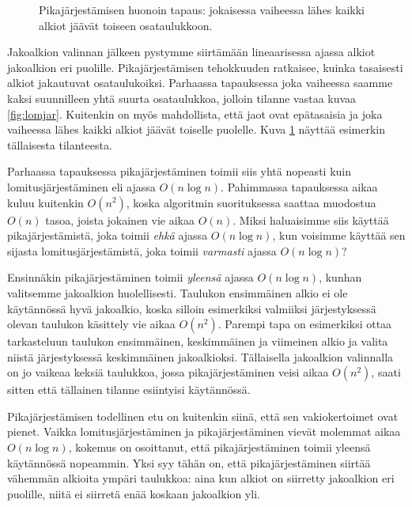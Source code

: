 \begin{figure}
\center
{}
\caption{Pikajärjestämisen huonoin tapaus: jokaisessa vaiheessa lähes kaikki
alkiot jäävät toiseen osataulukkoon.}
\label{fig:pikjar}
\end{figure}

Jakoalkion valinnan jälkeen pystymme siirtämään lineaarisessa ajassa
alkiot jakoalkion eri puolille.
Pikajärjestämisen tehokkuuden ratkaisee, kuinka tasaisesti
alkiot jakautuvat osataulukoiksi.
Parhaassa tapauksessa joka vaiheessa saamme kaksi suunnilleen
yhtä suurta osataulukkoa, jolloin tilanne vastaa kuvaa \ref{fig:lomjar}.
Kuitenkin on myös mahdollista, että jaot ovat epätasaisia ja
joka vaiheessa lähes kaikki alkiot jäävät toiselle puolelle.
Kuva \ref{fig:pikjar} näyttää esimerkin tällaisesta tilanteesta.

Parhaassa tapauksessa pikajärjestäminen toimii siis yhtä nopeasti
kuin lomitusjärjestäminen eli ajassa $O(n \log n)$.
Pahimmassa tapauksessa aikaa kuluu kuitenkin $O(n^2)$,
koska algoritmin suorituksessa saattaa muodostua $O(n)$ tasoa,
joista jokainen vie aikaa $O(n)$.
Miksi haluaisimme siis käyttää pikajärjestämistä,
joka toimii \emph{ehkä} ajassa $O(n \log n)$,
kun voisimme käyttää sen sijasta lomitusjärjestämistä,
joka toimii \emph{varmasti} ajassa $O(n \log n)$?

Ensinnäkin pikajärjestäminen toimii \emph{yleensä}
ajassa $O(n \log n)$, kunhan valitsemme jakoalkion huolellisesti.
Taulukon ensimmäinen alkio ei ole käytän\-nössä hyvä jakoalkio,
koska silloin esimerkiksi valmiiksi järjestyksessä olevan
taulukon käsittely vie aikaa $O(n^2)$.
Parempi tapa on esimerkiksi ottaa tarkasteluun taulukon ensimmäinen,
keskimmäinen ja viimeinen alkio ja valita niistä
järjestyksessä keskimmäinen jakoalkioksi.
Tällaisella jakoalkion valinnalla on jo vaikeaa keksiä taulukkoa,
jossa pikajärjestäminen veisi aikaa $O(n^2)$,
saati sitten että tällainen tilanne esiintyisi käytännössä.

Pikajärjestämisen todellinen etu on kuitenkin siinä,
että sen vakiokertoimet ovat pienet.
Vaikka lomitusjärjestäminen ja pikajärjestäminen vievät molemmat
aikaa $O(n \log n)$, kokemus on osoittanut, että
pikajärjestäminen toimii yleensä käytännössä nopeammin.
Yksi syy tähän on, että pikajärjestä\-minen siirtää vähemmän
alkioita ympäri taulukkoa: aina kun alkiot on siirretty
jakoalkion eri puolille, niitä ei siirretä enää koskaan
jakoalkion yli.

